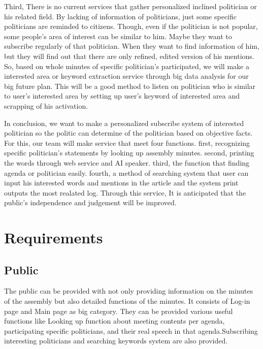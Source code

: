 \documentclass[conference]{IEEEtran}
\begin{document}
Third, There is no current services that gather personalized inclined politician or his related field. By lacking of information of politicians, just some specific politicians are reminded to citizens. Though, even if the politician is not popular, some people’s area of interest can be similar to him. Maybe they want to subscribe regularly of that politician. When they want to find information of him, but they will find out that there are only refined, edited version of his mentions. So, based on whole minutes of specific politician’s participated, we will make a interested area or keyword extraction service through big data analysis for our big future plan. This will be a good method to listen on politician who is similar to user’s interested area by setting up user’s keyword of interested area and scrapping of his activation.
 
In conclusion, we want to make a  personalized subscribe system of interested politician so the politic can determine of the politician based on objective facts. For this, our team will make service that meet four functions. first, recognizing specific politician’s statements by looking up assembly minutes. second, printing the words through web service and AI speaker. third, the function that finding agenda or politician easily. fourth, a method of searching system that user can input his interested words and mentions in the article and the system print outputs the most realated log. Through this service, It is anticipated that the public’s independence and judgement will be improved.
 
 \vspace{90mm}

\section{Requirements}
\subsection{Public}

The public can be provided with  not only providing information on the minutes of the assembly but also detailed functions of the minutes. It consists of Log-in page and Main page as big category. They can be provided various useful functions like Looking up function about meeting contents per agenda, participating specific politicians, and their real speech in that agenda.Subscribing interesting politicians and searching keywords system are also provided. \\
 
\end{document}
